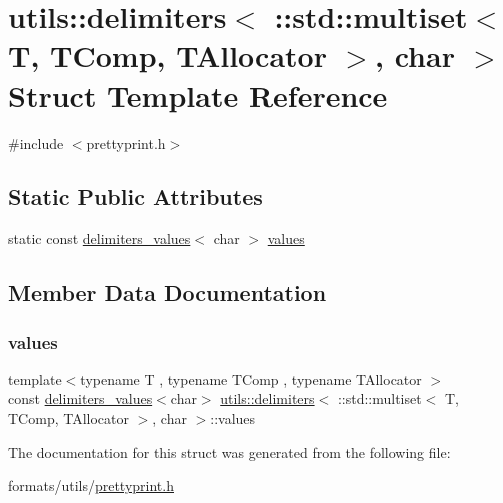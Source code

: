 \hypertarget{structutils_1_1delimiters_3_01_1_1std_1_1multiset_3_01_t_00_01_t_comp_00_01_t_allocator_01_4_00_01char_01_4}{}\section{utils\+::delimiters$<$ \+::std\+::multiset$<$ T, T\+Comp, T\+Allocator $>$, char $>$ Struct Template Reference}
\label{structutils_1_1delimiters_3_01_1_1std_1_1multiset_3_01_t_00_01_t_comp_00_01_t_allocator_01_4_00_01char_01_4}


{\ttfamily \#include $<$prettyprint.\+h$>$}

\subsection*{Static Public Attributes}
\begin{DoxyCompactItemize}
\item 
static const \mbox{\hyperlink{structutils_1_1delimiters__values}{delimiters\+\_\+values}}$<$ char $>$ \mbox{\hyperlink{structutils_1_1delimiters_3_01_1_1std_1_1multiset_3_01_t_00_01_t_comp_00_01_t_allocator_01_4_00_01char_01_4_a8735adf5dfdf733b281cf38d3d28fe58}{values}}
\end{DoxyCompactItemize}


\subsection{Member Data Documentation}
\mbox{\label{structutils_1_1delimiters_3_01_1_1std_1_1multiset_3_01_t_00_01_t_comp_00_01_t_allocator_01_4_00_01char_01_4_a8735adf5dfdf733b281cf38d3d28fe58}} 
\subsubsection{\texorpdfstring{values}{values}}
{\footnotesize\ttfamily template$<$typename T , typename T\+Comp , typename T\+Allocator $>$ \\
const \mbox{\hyperlink{structutils_1_1delimiters__values}{delimiters\+\_\+values}}$<$char$>$ \mbox{\hyperlink{structutils_1_1delimiters}{utils\+::delimiters}}$<$ \+::std\+::multiset$<$ T, T\+Comp, T\+Allocator $>$, char $>$\+::values\hspace{0.3cm}{\ttfamily [static]}}



The documentation for this struct was generated from the following file\+:\begin{DoxyCompactItemize}
\item 
formats/utils/\mbox{\hyperlink{prettyprint_8h}{prettyprint.\+h}}\end{DoxyCompactItemize}

